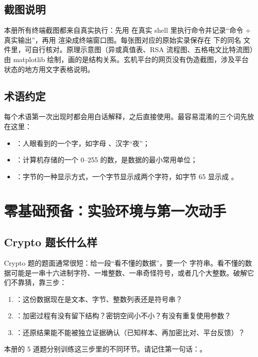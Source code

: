 \documentclass[UTF8,12pt,oneside]{ctexbook}
\begin{document}
\section*{截图说明}
本册所有终端截图都来自真实执行：先用  在真实 shell 里执行命令并记录“命令 + 真实输出”，再用  渲染成终端窗口图。每张图对应的原始实录保存在  下的同名  文件里，可自行核对。原理示意图（异或真值表、RSA 流程图、五格电文比特流图）由 matplotlib 绘制，画的是结构关系。玄机平台的网页没有伪造截图，涉及平台状态的地方用文字表格说明。

\section*{术语约定}
每个术语第一次出现时都会用白话解释，之后直接使用。最容易混淆的三个词先放在这里：
\begin{itemize}
\item {}：人眼看到的一个字，如字母 、汉字“夜”；
\item {}：计算机存储的一个 0--255 的数，是数据的最小常用单位；
\item {}：字节的一种显示方式，一个字节显示成两个字符，如字节 65 显示成 。
\end{itemize}

\tableofcontents
\mainmatter

\chapter{零基础预备：实验环境与第一次动手}

\section{Crypto 题长什么样}
Crypto 题的题面通常很短：给一段“看不懂的数据”，要一个  字符串。看不懂的数据可能是一串十六进制字符、一堆整数、一串奇怪符号，或者几个大整数。破解它们不靠猜，靠三步：
\begin{enumerate}
\item {}：这份数据现在是文本、字节、整数列表还是符号串？
\item {}：加密过程有没有留下结构？密钥空间小不小？有没有重复使用参数？
\item {}：还原结果能不能被独立证据确认（已知样本、再加密比对、平台反馈）？
\end{enumerate}
本册的 5 道题分别训练这三步里的不同环节。请记住第一句话：。
\end{document}
